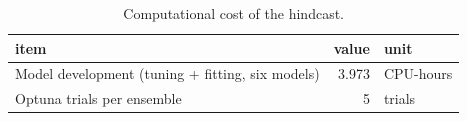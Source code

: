 \begin{table}
\caption{Computational cost of the hindcast.}
\label{tab:T14_compute}
\begin{tabular}{lrl}
\toprule
item & value & unit \\
\midrule
Model development (tuning + fitting, six models) & 3.973 & CPU-hours \\
Optuna trials per ensemble & 5 & trials \\
\bottomrule
\end{tabular}
\end{table}
